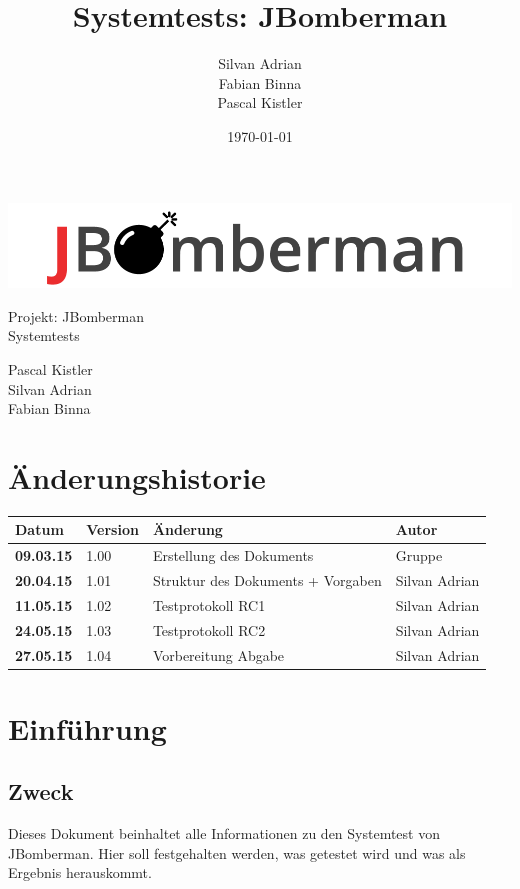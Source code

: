 \documentclass[11pt]{scrartcl}
\title{Systemtests: JBomberman}
\author{Silvan Adrian \\ Fabian Binna \\ Pascal Kistler}
\date{\today{}}
\begin{document}
\def\arraystretch{1.5}
\begin{titlepage}
\begin{center}
\vspace{10em}
\includegraphics[scale=2]{jbomberman}
\vspace{10em}
\end{center}
\begin{center}
\huge {Projekt: JBomberman} \\
\huge {Systemtests}
\end{center}
\begin{center}
\vspace{10em}
\LARGE {Pascal Kistler} \\
\LARGE {Silvan Adrian} \\
\LARGE {Fabian Binna}
\end{center}

\end{titlepage}

\newpage
\section{Änderungshistorie}
\label{sec:Änderungen}

\begin{tabularx}{\linewidth}{l l l l}
\textbf{Datum} & \textbf{Version} & \textbf{Änderung}  & \textbf{Autor} \\
\hline
\textbf{09.03.15} & 1.00 & Erstellung des Dokuments & Gruppe \\
\textbf{20.04.15} & 1.01 & Struktur des Dokuments + Vorgaben & Silvan Adrian \\
\textbf{11.05.15} & 1.02 & Testprotokoll RC1 & Silvan Adrian \\
\textbf{24.05.15} & 1.03 & Testprotokoll RC2 & Silvan Adrian \\
\textbf{27.05.15} & 1.04 & Vorbereitung Abgabe & Silvan Adrian\\
\end{tabularx}

\newpage
\tableofcontents
\newpage
\section{Einführung}
\subsection{Zweck}
Dieses Dokument beinhaltet alle Informationen zu den Systemtest von JBomberman.
Hier soll festgehalten werden, was getestet wird und was als Ergebnis herauskommt.
\end{document}
